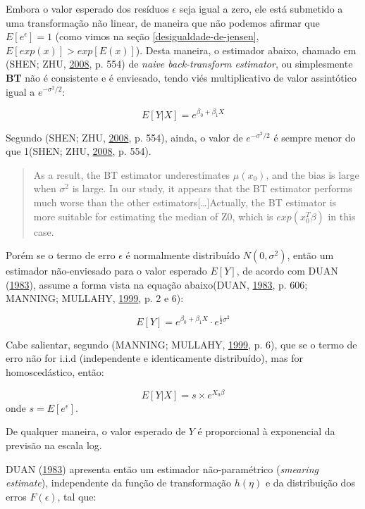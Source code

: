 \documentclass[a4paper]{article}
\begin{document}
Embora o valor esperado dos resíduos \(\epsilon\) seja igual a zero, ele
está submetido a uma transformação não linear, de maneira que não
podemos afirmar que \(E[e^\epsilon] = 1\) (como vimos na seção
\ref{desigualdade-de-jensen}, \(E[exp(x)] > exp[E(x)]\)). Desta maneira,
o estimador abaixo, chamado em (SHEN; ZHU,
\protect\hyperlink{ref-shen}{2008}, p. 554) de \emph{naive
back-transform estimator}, ou simplesmente \textbf{BT} não é consistente
e é enviesado, tendo viés multiplicativo de valor assintótico igual a
\(e^{-\sigma^2/2}\):

\[E[Y|X] = e^{\beta_0 + \beta_1X}\]

Segundo (SHEN; ZHU, \protect\hyperlink{ref-shen}{2008}, p. 554), ainda,
o valor de \(e^{-\sigma^2/2}\) é sempre menor do que 1(SHEN; ZHU,
\protect\hyperlink{ref-shen}{2008}, p. 554).

\begin{quote}
As a result, the BT estimator underestimates \(\mu(x_0)\), and the bias
is large when \(\sigma^2\) is large. In our study, it appears that the
BT estimator performs much worse than the other
estimators{[}\ldots{}{]}Actually, the BT estimator is more suitable for
estimating the median of Z0, which is \(exp(x_0^T\beta)\) in this case.
\end{quote}

Porém se o termo de erro \(\epsilon\) é normalmente distribuído
\(N(0,\sigma^2)\), então um estimador não-enviesado para o valor
esperado \(E[Y]\), de acordo com DUAN
(\protect\hyperlink{ref-Duan}{1983}), assume a forma vista na equação
abaixo(DUAN, \protect\hyperlink{ref-Duan}{1983}, p. 606; MANNING;
MULLAHY, \protect\hyperlink{ref-NBERt0246}{1999}, p. 2 e 6):

\[E[Y] = e^{\beta_0 + \beta_1X} \cdot e^{\frac{1}{2}\sigma^2}\]

Cabe salientar, segundo (MANNING; MULLAHY,
\protect\hyperlink{ref-NBERt0246}{1999}, p. 6), que se o termo de erro
não for i.i.d (independente e identicamente distribuído), mas for
homoscedástico, então:

\[E[Y|X]=s \times e^{X_0\beta}\] onde \(s = E[e^\epsilon]\).

De qualquer maneira, o valor esperado de \(Y\) é proporcional à
exponencial da previsão na escala log.

DUAN (\protect\hyperlink{ref-Duan}{1983}) apresenta então um estimador
não-paramétrico (\emph{smearing estimate}), independente da função de
transformação \(h(\eta)\) e da distribuição dos erros \(F(\epsilon)\),
tal que:
\end{document}

